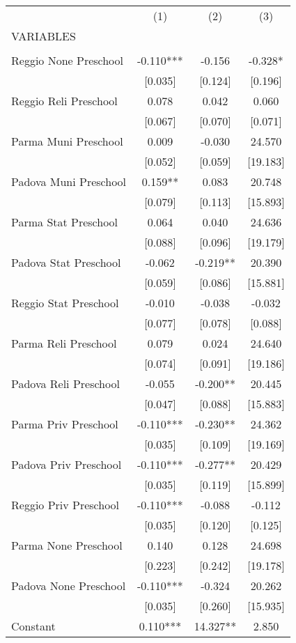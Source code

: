 \begin{tabular}{lccc} \hline
 & (1) & (2) & (3) \\
VARIABLES &  &  &  \\ \hline
 &  &  &  \\
Reggio None Preschool & -0.110*** & -0.156 & -0.328* \\
 & [0.035] & [0.124] & [0.196] \\
Reggio Reli Preschool & 0.078 & 0.042 & 0.060 \\
 & [0.067] & [0.070] & [0.071] \\
Parma Muni Preschool & 0.009 & -0.030 & 24.570 \\
 & [0.052] & [0.059] & [19.183] \\
Padova Muni Preschool & 0.159** & 0.083 & 20.748 \\
 & [0.079] & [0.113] & [15.893] \\
Parma Stat Preschool & 0.064 & 0.040 & 24.636 \\
 & [0.088] & [0.096] & [19.179] \\
Padova Stat Preschool & -0.062 & -0.219** & 20.390 \\
 & [0.059] & [0.086] & [15.881] \\
Reggio Stat Preschool & -0.010 & -0.038 & -0.032 \\
 & [0.077] & [0.078] & [0.088] \\
Parma Reli Preschool & 0.079 & 0.024 & 24.640 \\
 & [0.074] & [0.091] & [19.186] \\
Padova Reli Preschool & -0.055 & -0.200** & 20.445 \\
 & [0.047] & [0.088] & [15.883] \\
Parma Priv Preschool & -0.110*** & -0.230** & 24.362 \\
 & [0.035] & [0.109] & [19.169] \\
Padova Priv Preschool & -0.110*** & -0.277** & 20.429 \\
 & [0.035] & [0.119] & [15.899] \\
Reggio Priv Preschool & -0.110*** & -0.088 & -0.112 \\
 & [0.035] & [0.120] & [0.125] \\
Parma None Preschool & 0.140 & 0.128 & 24.698 \\
 & [0.223] & [0.242] & [19.178] \\
Padova None Preschool & -0.110*** & -0.324 & 20.262 \\
 & [0.035] & [0.260] & [15.935] \\
Constant & 0.110*** & 14.327** & 2.850 \\

\end{tabular}
